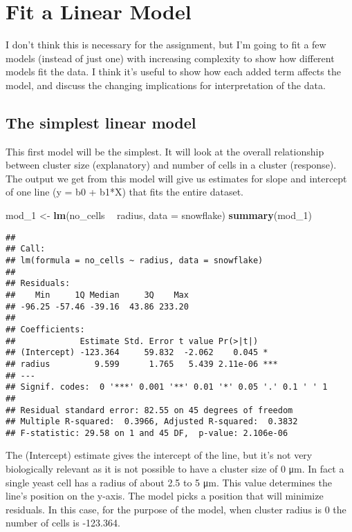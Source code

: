\documentclass[]{article}
\newenvironment{Shaded}{\begin{snugshade}}{\end{snugshade}}
\newcommand{\KeywordTok}[1]{\textcolor[rgb]{0.13,0.29,0.53}{\textbf{#1}}}
\newcommand{\DataTypeTok}[1]{\textcolor[rgb]{0.13,0.29,0.53}{#1}}
\newcommand{\DecValTok}[1]{\textcolor[rgb]{0.00,0.00,0.81}{#1}}
\newcommand{\StringTok}[1]{\textcolor[rgb]{0.31,0.60,0.02}{#1}}
\newcommand{\OperatorTok}[1]{\textcolor[rgb]{0.81,0.36,0.00}{\textbf{#1}}}
\newcommand{\NormalTok}[1]{#1}
\begin{document}
\section{Fit a Linear Model}\label{fit-a-linear-model}

I don't think this is necessary for the assignment, but I'm going to fit
a few models (instead of just one) with increasing complexity to show
how different models fit the data. I think it's useful to show how each
added term affects the model, and discuss the changing implications for
interpretation of the data.

\subsection{The simplest linear model}\label{the-simplest-linear-model}

This first model will be the simplest. It will look at the overall
relationship between cluster size (explanatory) and number of cells in a
cluster (response). The output we get from this model will give us
estimates for slope and intercept of one line (y = b0 + b1*X) that fits
the entire dataset.

\begin{Shaded}
\begin{Highlighting}[]
\NormalTok{mod_}\DecValTok{1}\NormalTok{ <-}\StringTok{ }\KeywordTok{lm}\NormalTok{(no_cells }\OperatorTok{~}\StringTok{ }\NormalTok{radius, }\DataTypeTok{data =}\NormalTok{ snowflake)}
\KeywordTok{summary}\NormalTok{(mod_}\DecValTok{1}\NormalTok{)}
\end{Highlighting}
\end{Shaded}

\begin{verbatim}
## 
## Call:
## lm(formula = no_cells ~ radius, data = snowflake)
## 
## Residuals:
##    Min     1Q Median     3Q    Max 
## -96.25 -57.46 -39.16  43.86 233.20 
## 
## Coefficients:
##             Estimate Std. Error t value Pr(>|t|)    
## (Intercept) -123.364     59.832  -2.062    0.045 *  
## radius         9.599      1.765   5.439 2.11e-06 ***
## ---
## Signif. codes:  0 '***' 0.001 '**' 0.01 '*' 0.05 '.' 0.1 ' ' 1
## 
## Residual standard error: 82.55 on 45 degrees of freedom
## Multiple R-squared:  0.3966, Adjusted R-squared:  0.3832 
## F-statistic: 29.58 on 1 and 45 DF,  p-value: 2.106e-06
\end{verbatim}

The (Intercept) estimate gives the intercept of the line, but it's not
very biologically relevant as it is not possible to have a cluster size
of 0 μm. In fact a single yeast cell has a radius of about 2.5 to 5 μm.
This value determines the line's position on the y-axis. The model picks
a position that will minimize residuals. In this case, for the purpose
of the model, when cluster radius is 0 the number of cells is -123.364.
\end{document}
